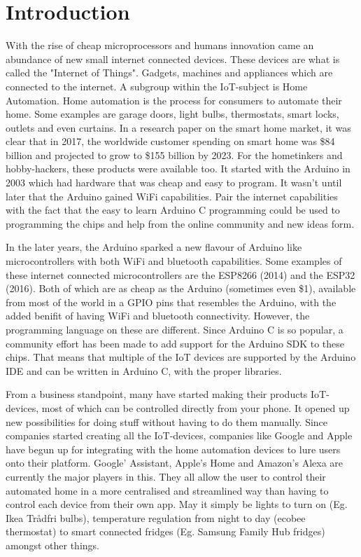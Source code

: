 \chapter{Introduction}\label{ch:introduction}
With the rise of cheap microprocessors and humans innovation came an abundance of new small internet connected devices. These devices are what is called the "Internet of Things". Gadgets, machines and appliances which are connected to the internet\cite{iot-definition}. A subgroup within the IoT-subject is Home Automation. Home automation is the process for consumers to automate their home. Some examples are garage doors, light bulbs, thermostats, smart locks, outlets and even curtains. In a research paper\cite{home-auto-growth} on the smart home market, it was clear that in 2017, the worldwide customer spending on smart home was \$84 billion and projected to grow to \$155 billion by 2023. For the hometinkers and hobby-hackers, these products were available too. It started with the Arduino in 2003 which had hardware that was cheap and easy to program\cite{arduino-history}. It wasn't until later that the Arduino gained WiFi capabilities. Pair the internet capabilities with the fact that the easy to learn Arduino C programming could be used to programming the chips and help from the online community and new ideas form. 

In the later years, the Arduino sparked a new flavour of Arduino like microcontrollers with both WiFi and bluetooth capabilities. Some examples of these internet connected microcontrollers are the ESP8266 (2014) and the ESP32 (2016). Both of which are as cheap as the Arduino (sometimes even \$1), available from most of the world in a GPIO pins that resembles the Arduino, with the added benifit of having WiFi and bluetooth connectivity. However, the programming language on these are different. Since Arduino C is so popular, a community effort has been made to add support for the Arduino SDK to these chips. That means that multiple of the IoT devices are supported by the Arduino IDE and can be written in Arduino C, with the proper libraries.

From a business standpoint, many have started making their products IoT-devices, most of which can be controlled directly from your phone. It opened up new possibilities for doing stuff without having to do them manually. Since companies started creating all the IoT-devices, companies like Google and Apple have begun up for integrating with the home automation devices to lure users onto their platform. Google' Assistant\cite{google-assistant}, Apple's Home\cite{apple-homekit} and Amazon's Alexa\cite{amazon-alexa} are currently the major players in this. They all allow the user to control their automated home in a more centralised and streamlined way than having to control each device from their own app. May it simply be lights to turn on (Eg. Ikea Trådfri bulbs), temperature regulation from night to day (ecobee thermostat) to smart connected fridges (Eg. Samsung Family Hub fridges) amongst other things. 